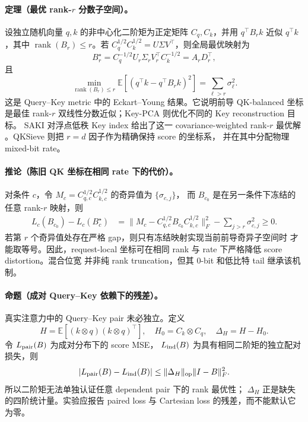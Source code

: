 \paragraph{定理（最优 rank-$r$ 分数子空间）。}
设独立随机向量 $q,k$ 的非中心化二阶矩为正定矩阵 $C_q,C_k$，并用
$q^\top B_rk$ 近似 $q^\top k$，其中
$\operatorname{rank}(B_r)\le r$。若
$C_q^{1/2}C_k^{1/2}=U\Sigma V^\top$，则全局最优映射为
\begin{equation}
 B_r^\star
 =C_q^{-1/2}U_r\Sigma_rV_r^\top C_k^{-1/2}
 =A_rD_r^\top ,
 \label{eq:optimal-rank-score-map}
\end{equation}
且
\begin{equation}
 \min_{\operatorname{rank}(B_r)\le r}
 \mathbb E[(q^\top k-q^\top B_rk)^2]
 =\sum_{\ell>r}\sigma_\ell^2.
 \label{eq:optimal-rank-score-error}
\end{equation}
这是 Query--Key metric 中的 Eckart--Young 结果。它说明前导
QK-balanced 坐标是最佳 rank-$r$ 双线性分数近似；Key-PCA 则优化不同的
Key reconstruction 目标。
SAKI 对浮点低秩 Key index 给出了这一 covariance-weighted rank-$r$ 最优解
\citep{zhang2026saki}。QKSieve 则把 $r=d$ 因子作为精确保持 score 的坐标系，
并在其中分配物理 mixed-bit rate。

\paragraph{推论（陈旧 QK 坐标在相同 rate 下的代价）。}
对条件 $c$，令
$M_c=C_{q,c}^{1/2}C_{k,c}^{1/2}$ 的奇异值为 $\{\sigma_{c,j}\}$，
而 $B_{c_0}$ 是在另一条件下冻结的任意 rank-$r$ 映射，则
\begin{align}
 L_c(B_{c_0})-L_c(B_c^\star)
 &=
 \|M_c-C_{q,c}^{1/2}B_{c_0}C_{k,c}^{1/2}\|_F^2
 -\sum_{j>r}\sigma_{c,j}^2
 \ge0 .
 \label{eq:stale-qk-coordinate-excess}
\end{align}
若第 $r$ 个奇异值处存在严格 gap，则只有冻结映射实现当前前导奇异子空间时
才能取等号。因此，request-local 坐标可在相同 rank 与 rate 下严格降低
score distortion。混合位宽 \method 并非纯 rank truncation，但其 0-bit
和低比特 tail 继承该机制。

\paragraph{命题（成对 Query--Key 依赖下的残差）。}
真实注意力中的 Query--Key pair 未必独立。定义
\begin{equation}
 H=\mathbb E[(k\otimes q)(k\otimes q)^\top],\quad
 H_0=C_k\otimes C_q,\quad
 \Delta_H=H-H_0 .
\end{equation}
令 $L_{\rm pair}(B)$ 为成对分布下的 score MSE，
$L_{\rm ind}(B)$ 为具有相同二阶矩的独立配对损失，则
\begin{equation}
 |L_{\rm pair}(B)-L_{\rm ind}(B)|
 \le \|\Delta_H\|_{\mathrm{op}}\|I-B\|_F^2.
 \label{eq:paired-qk-dependence}
\end{equation}
所以二阶矩无法单独认证任意 dependent pair 下的 rank 最优性；
$\Delta_H$ 正是缺失的四阶统计量。实验应报告 paired loss 与 Cartesian
loss 的残差，而不能默认它为零。

